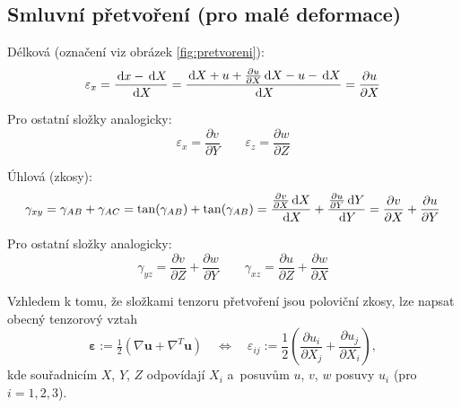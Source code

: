 
\subsection{Smluvní přetvoření (pro malé deformace)}
Délková (označení viz obrázek \ref{fig:pretvoreni}):
\begin{equation}
	\varepsilon_x
	= \frac{\,\mathrm{d} x - \,\mathrm{d} X}{\,\mathrm{d} X}
	= \frac{\,\mathrm{d} X + u + \frac{\partial u}{\partial X}\,\mathrm{d} X - u - \,\mathrm{d} X}{\,\mathrm{d} X}
	= \frac{\partial u}{\partial X}
\end{equation}

Pro ostatní složky analogicky:
\begin{equation}
	\varepsilon_x
	= \frac{\partial v}{\partial Y}
	\qquad
	\varepsilon_z
	= \frac{\partial w}{\partial Z}
\end{equation}

Úhlová (zkosy):
\begin{equation}
	\gamma_{xy}
	= \gamma_{AB} + \gamma_{AC}
	= \tan(\gamma_{AB}) + \tan(\gamma_{AB})
	= \frac{\frac{\partial v}{\partial X} \,\mathrm{d} X}{\,\mathrm{d} X}
	+ \frac{\frac{\partial u}{\partial Y} \,\mathrm{d} Y}{\,\mathrm{d} Y}
	= \frac{\partial v}{\partial X} + \frac{\partial u}{\partial Y}
\end{equation}

Pro ostatní složky analogicky:
\begin{equation}
	\gamma_{yz}
	= \frac{\partial v}{\partial Z} + \frac{\partial w}{\partial Y}
	\qquad
	\gamma_{xz}
	= \frac{\partial u}{\partial Z} + \frac{\partial w}{\partial X}
\end{equation}

Vzhledem k tomu, že složkami tenzoru přetvoření jsou poloviční zkosy, lze napsat obecný tenzorový vztah
\begin{equation}
	\bm{\varepsilon} := \tfrac{1}{2} \left( \nabla\bm{u} + \nabla^T\bm{u} \right)
	\quad\Leftrightarrow\quad
	\varepsilon_{ij} := \frac{1}{2} \left( \frac{\partial u_i}{\partial X_j} + \frac{\partial u_j}{\partial X_i} \right),
\end{equation}
kde souřadnicím $X$, $Y$, $Z$ odpovídají $X_i$ a~posuvům $u$, $v$, $w$ posuvy $u_i$ (pro $i=1,2,3$).
